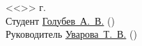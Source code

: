 \documentclass[a4paper, 14pt]{extreport}
\begin{document}
    \pagestyle{empty}
    \vspace{\fill}
    \noindent<<\underline{\hspace{1cm}}>> \underline{\hspace{5cm}} \the\year г.\\
    Студент \hspace{1cm} \underline{Голубев~А.~В.\hspace{3.2cm}} \hspace{2cm} (\underline{\hspace{5cm}})\\
    Руководитель \underline{Уварова~Т.~В.\hspace{3.25cm}} \hspace{2cm} (\underline{\hspace{5cm}})\\
\end{document}

